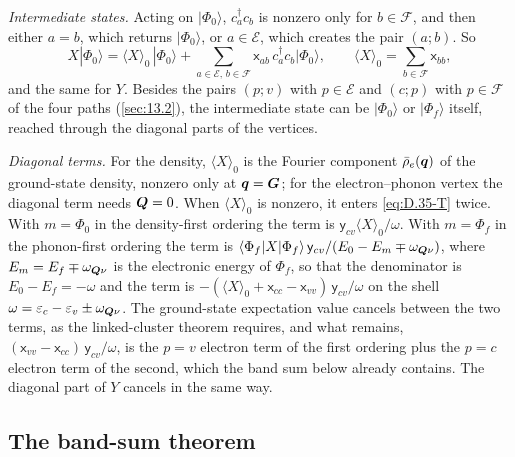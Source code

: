 \emph{Intermediate states.} Acting on $|\Phi_0\rangle$, $c^\dagger_ac_b$ is nonzero only for $b\in\mathcal{F}$, and then either $a = b$, which returns $|\Phi_0\rangle$, or $a\in\mathcal{E}$, which creates the pair $(a;b)$. So
\begin{equation*}
  X|\Phi_0\rangle = \langle X\rangle_0\,|\Phi_0\rangle + \sum_{a\in\mathcal{E},\,b\in\mathcal{F}}\mathsf{x}_{ab}\,c^\dagger_ac_b|\Phi_0\rangle , \qquad \langle X\rangle_0 = \sum_{b\in\mathcal{F}}\mathsf{x}_{bb} ,
\end{equation*}
and the same for $Y$. Besides the pairs $(p;v)$ with $p\in\mathcal{E}$ and $(c;p)$ with $p\in\mathcal{F}$ of the four paths (\cref{sec:13.2}), the intermediate state can be $|\Phi_0\rangle$ or $|\Phi_f\rangle$ itself, reached through the diagonal parts of the vertices.

\emph{Diagonal terms.} For the density, $\langle X\rangle_0$ is the Fourier component $\bar\rho_e(\bm{q})$ of the ground-state density, nonzero only at $\bm{q} = \bm{G}$; for the electron--phonon vertex the diagonal term needs $\bm{Q} = 0$. When $\langle X\rangle_0$ is nonzero, it enters \cref{eq:D.35-T} twice. With $m = \Phi_0$ in the density-first ordering the term is $\mathsf{y}_{cv}\langle X\rangle_0/\omega$. With $m = \Phi_f$ in the phonon-first ordering the term is $\langle\Phi_f|X|\Phi_f\rangle\,\mathsf{y}_{cv}/(E_0 - E_m \mp \omega_{\bm{Q}\nu})$, where $E_m = E_f \mp \omega_{\bm{Q}\nu}$ is the electronic energy of $\Phi_f$, so that the denominator is $E_0 - E_f = -\omega$ and the term is $-(\langle X\rangle_0 + \mathsf{x}_{cc} - \mathsf{x}_{vv})\,\mathsf{y}_{cv}/\omega$ on the shell $\omega = \varepsilon_c - \varepsilon_v \pm \omega_{\bm{Q}\nu}$. The ground-state expectation value cancels between the two terms, as the linked-cluster theorem requires, and what remains, $(\mathsf{x}_{vv} - \mathsf{x}_{cc})\,\mathsf{y}_{cv}/\omega$, is the $p = v$ electron term of the first ordering plus the $p = c$ electron term of the second, which the band sum below already contains. The diagonal part of $Y$ cancels in the same way.

\subsection*{The band-sum theorem}


